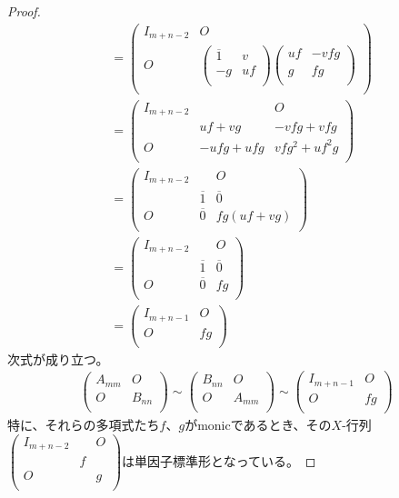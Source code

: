 \documentclass[dvipdfmx]{jsarticle}
\begin{document}
\begin{proof}
\begin{align*}
&= \begin{pmatrix}
I_{m + n - 2} & O \\
O & \begin{pmatrix}
\overline{1} & v \\
 - g & uf \\
\end{pmatrix}\begin{pmatrix}
uf & - vfg \\
g & fg \\
\end{pmatrix} \\
\end{pmatrix}\\
&= \begin{pmatrix}
I_{m + n - 2} & \  & O \\
\  & uf + vg & - vfg + vfg \\
O & - ufg + ufg & vfg^{2} + uf^{2}g \\
\end{pmatrix}\\
&= \begin{pmatrix}
I_{m + n - 2} & \  & O \\
\  & \overline{1} & \overline{0} \\
O & \overline{0} & fg(uf + vg) \\
\end{pmatrix}\\
&= \begin{pmatrix}
I_{m + n - 2} & \  & O \\
\  & \overline{1} & \overline{0} \\
O & \overline{0} & fg \\
\end{pmatrix}\\
&= \begin{pmatrix}
I_{m + n - 1} & O \\
O & fg \\
\end{pmatrix}
\end{align*}
次式が成り立つ。
\begin{align*}
\begin{pmatrix}
A_{mm} & O \\
O & B_{nn} \\
\end{pmatrix} \sim \begin{pmatrix}
B_{nn} & O \\
O & A_{mm} \\
\end{pmatrix} \sim \begin{pmatrix}
I_{m + n - 1} & O \\
O & fg \\
\end{pmatrix}
\end{align*}
特に、それらの多項式たち$f$、$g$がmonicであるとき、その$X$-行列$\begin{pmatrix}
I_{m + n - 2} & \  & O \\
\  & f & \  \\
O & \  & g \\
\end{pmatrix}$は単因子標準形となっている。
\end{proof}
\end{document}

